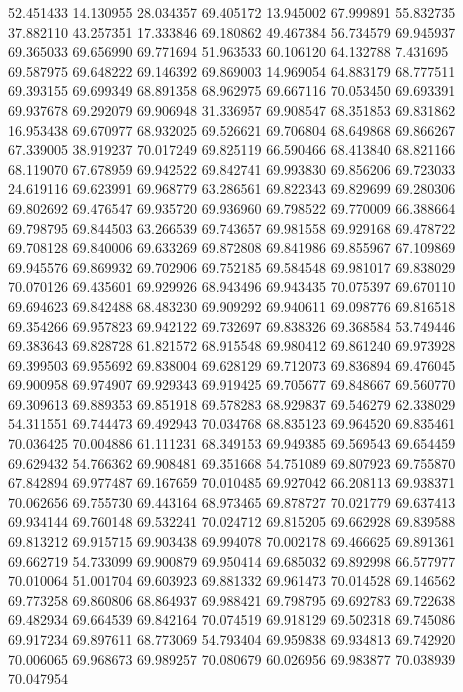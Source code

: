 52.451433
14.130955
28.034357
69.405172
13.945002
67.999891
55.832735
37.882110
43.257351
17.333846
69.180862
49.467384
56.734579
69.945937
69.365033
69.656990
69.771694
51.963533
60.106120
64.132788
7.431695
69.587975
69.648222
69.146392
69.869003
14.969054
64.883179
68.777511
69.393155
69.699349
68.891358
68.962975
69.667116
70.053450
69.693391
69.937678
69.292079
69.906948
31.336957
69.908547
68.351853
69.831862
16.953438
69.670977
68.932025
69.526621
69.706804
68.649868
69.866267
67.339005
38.919237
70.017249
69.825119
66.590466
68.413840
68.821166
68.119070
67.678959
69.942522
69.842741
69.993830
69.856206
69.723033
24.619116
69.623991
69.968779
63.286561
69.822343
69.829699
69.280306
69.802692
69.476547
69.935720
69.936960
69.798522
69.770009
66.388664
69.798795
69.844503
63.266539
69.743657
69.981558
69.929168
69.478722
69.708128
69.840006
69.633269
69.872808
69.841986
69.855967
67.109869
69.945576
69.869932
69.702906
69.752185
69.584548
69.981017
69.838029
70.070126
69.435601
69.929926
68.943496
69.943435
70.075397
69.670110
69.694623
69.842488
68.483230
69.909292
69.940611
69.098776
69.816518
69.354266
69.957823
69.942122
69.732697
69.838326
69.368584
53.749446
69.383643
69.828728
61.821572
68.915548
69.980412
69.861240
69.973928
69.399503
69.955692
69.838004
69.628129
69.712073
69.836894
69.476045
69.900958
69.974907
69.929343
69.919425
69.705677
69.848667
69.560770
69.309613
69.889353
69.851918
69.578283
68.929837
69.546279
62.338029
54.311551
69.744473
69.492943
70.034768
68.835123
69.964520
69.835461
70.036425
70.004886
61.111231
68.349153
69.949385
69.569543
69.654459
69.629432
54.766362
69.908481
69.351668
54.751089
69.807923
69.755870
67.842894
69.977487
69.167659
70.010485
69.927042
66.208113
69.938371
70.062656
69.755730
69.443164
68.973465
69.878727
70.021779
69.637413
69.934144
69.760148
69.532241
70.024712
69.815205
69.662928
69.839588
69.813212
69.915715
69.903438
69.994078
70.002178
69.466625
69.891361
69.662719
54.733099
69.900879
69.950414
69.685032
69.892998
66.577977
70.010064
51.001704
69.603923
69.881332
69.961473
70.014528
69.146562
69.773258
69.860806
68.864937
69.988421
69.798795
69.692783
69.722638
69.482934
69.664539
69.842164
70.074519
69.918129
69.502318
69.745086
69.917234
69.897611
68.773069
54.793404
69.959838
69.934813
69.742920
70.006065
69.968673
69.989257
70.080679
60.026956
69.983877
70.038939
70.047954
